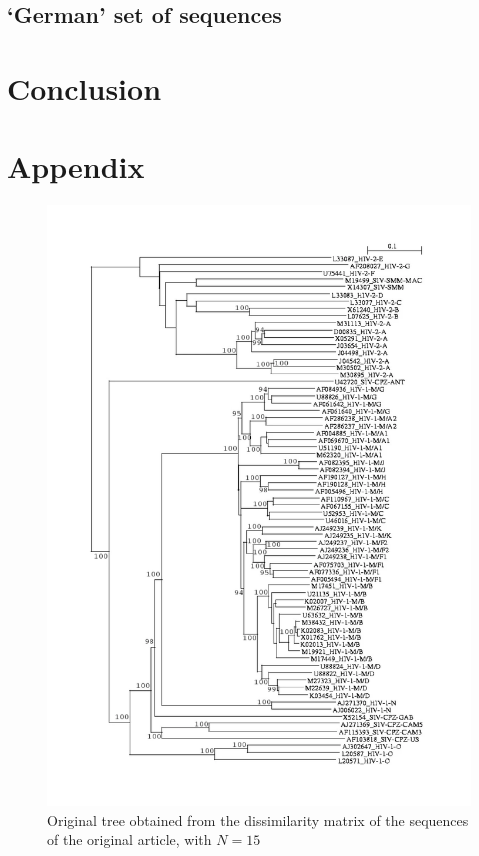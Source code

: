 \documentclass[english,13pt,a4paper]{article}
\theoremstyle{definition}
\theoremstyle{remark}
\theoremstyle{defstyle}
\begin{document}
\subsection{`German' set of sequences}


\section{Conclusion}


\newpage

\section*{Appendix}

\begin{figure}[H]
    \centering
    \includegraphics[width=\textwidth]{../Trees/original_66_tree.png}
    \caption{Original tree obtained from the dissimilarity matrix of the sequences of the original article, with $N = 15$}
    \label{fig:original_tree66}
\end{figure}
\end{document}
